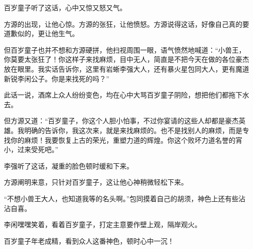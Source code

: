 \begin{this_body}
百岁童子听了这话，心中又惊又怒又气。

方源的出现，让他心惊。方源的张狂，让他愤怒。方源说得这话，好像自己真的要道歉似的，更让他生气。

但百岁童子也并不想和方源硬拼，他扫视周围一眼，语气愤然地喊道：“小兽王，你莫要太张狂了！你这样子来找麻烦，目中无人，简直是不把今天在做的各位豪杰放在眼里。我实话告诉你，这里有岩蜥李强大人，还有暴火星包同大人，更有魔道新锐李闲公子。你是来找死的吗？”

此话一说，酒席上众人纷纷变色，均在心中大骂百岁童子阴险，想把他们都拖下水去。

但方源又道：“百岁童子，你这个人胆小怕事，不过你宴请的这些人却都是豪杰英雄。我明确的告诉你，我这次来，就是来找麻烦的。也不是找别人的麻烦，而是专找你的麻烦！我要恢复上古的荣光，重塑力道的辉煌。你这个败坏力道名誉的宵小，过来受死吧。”

李强听了这话，凝重的脸色顿时缓和下来。

方源阐明来意，只针对百岁童子，这让他心神稍微轻松下来。

“不想小兽王大人，也知道我等的名头啊。”包同摸着自己的胡须，神色上还有些沾沾自喜。

李闲嘿嘿笑着，看着百岁童子，打定主意要作壁上观，隔岸观火。

百岁童子年老成精，看到众人这番神色，顿时心中一沉！

\end{this_body}

